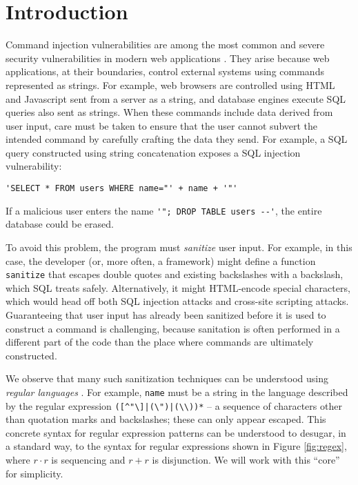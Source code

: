 \documentclass[9pt]{sig-alternate}
\theoremstyle{definition}
\begin{document}
\section{Introduction}\label{intro}
Command injection vulnerabilities are among the most common and severe security vulnerabilities in modern web applications \cite{OWASP}. They arise because web applications, at their boundaries, control external systems using commands represented as  strings. For example, web browsers are controlled using HTML and Javascript sent from a server as a string, and database engines execute SQL queries also sent as strings. When these commands include data derived from user input, care must be taken to ensure that the user cannot  subvert the intended command by carefully crafting the data they send. For example, a  SQL query constructed using string concatenation exposes a SQL injection vulnerability: 
\begin{lstlisting}[numbers=none]
'SELECT * FROM users WHERE name="' + name + '"'
\end{lstlisting}
If a malicious user enters the name \lstinline{'"; DROP TABLE users --'}, the entire database could be erased. 

To avoid this problem, the program must \emph{sanitize} user input. For example, in this case, the developer (or, more often, a framework) might define a function \verb|sanitize| that escapes double quotes and existing backslashes   with a backslash, which SQL treats safely. Alternatively, it might HTML-encode special characters, which would head off both SQL injection attacks and cross-site scripting attacks. Guaranteeing that user input has already been sanitized  before it is used to construct a command is challenging, because  sanitation is often performed in a different part of the code than the place where commands are ultimately constructed.%

We observe that many such sanitization techniques can be understood using \emph{regular languages} \cite{cinderella}. For example, \verb|name| must be a string in the language described by the regular expression \verb!([^"\]|(\")|(\\))*! -- a sequence of characters other than quotation marks and backslashes; these can only appear escaped. This concrete syntax for regular expression patterns can be understood to desugar, in a standard way, to the syntax for regular expressions shown in Figure \ref{fig:regex}, where $r \cdot r$ is sequencing and $r + r$ is  disjunction. We will work with this ``core'' for simplicity.
\end{document}
